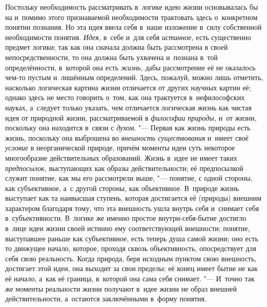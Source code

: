 Постольку необходимость рассматривать в~логике идею жизни
основывалась бы на и~помимо этого признаваемой необходимости трактовать
здесь о~конкретном понятии познания. Но эта идея ввела себя в~наше
изложение в~силу собственной необходимости понятия.
{\em Идея,} в~себе и~для
себя {\em истинное,} есть
существенно предмет логики; так как она сначала должна быть рассмотрена в
своей непосредственности, то она должна быть ухвачена и~познана в~той
определённости, в~которой она есть
{\em жизнь,} дабы
рассмотрение её не оказалось чем-то пустым и~лишённым определений. Здесь,
пожалуй, можно лишь отметить, насколько логическая картина жизни отличается
от других научных картин её; однако здесь не место говорить о~том, как она
трактуется в~нефилософских науках, а~следует только указать, чем отличается
логическая жизнь как чистая идея от природной жизни, рассматриваемой в
{\em философии природы,}
и~от жизни, поскольку она находится в~связи с
{\em духом}. "--- Первая как
жизнь природы есть жизнь, поскольку она выброшена во
{\em внешность существования}
и~имеет своё
{\em условие} в
неорганической природе, причём моменты идеи суть некоторое многообразие
действительных образований. Жизнь в~идее не имеет таких
{\em предпосылок,}
выступающих как образы действительности; её предпосылкой
служит понятие, как мы его рассмотрели выше, "--- понятие, с
одной стороны, как субъективное, а~с другой стороны, как объективное.
В~природе жизнь выступает как та наивысшая ступень, которая достигается её
(природы) внешним характером благодаря тому, что эта внешность ушла внутрь
себя и~снимает себя в~субъективности. В~логике же именно простое
внутри-себя-бытие достигло в~лице идеи жизни своей истинно ему
соответствующей внешности; понятие, выступавшее раньше как субъективное,
есть теперь душа самой жизни; оно есть то движущее начало, которое, проходя
сквозь объективность, опосредствует для себя свою реальность. Когда
природа, беря исходным пунктом свою внешность, достигает этой идеи, она
выходит за свои пределы; её конец имеет бытие не как её начало, а~как её
граница, в~которой она сама себя снимает. "--- И~точно так же
моменты реальности жизни получают в~идее жизни не образ
внешней действительности, а~остаются заключёнными в~форму понятия.

